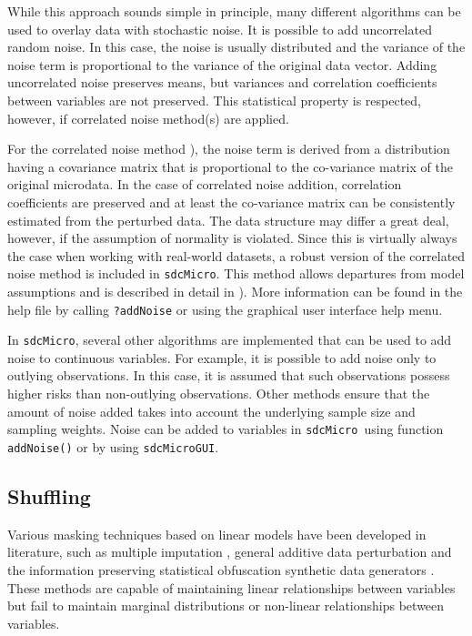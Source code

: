\documentclass[12pt]{scrartcl}\usepackage[]{graphicx}\usepackage[]{color}
\newcommand{\sdcMicro}{\texttt{sdcMicro}}
\newcommand{\sdcMicroGUI}{\texttt{sdcMicroGUI}}
\begin{document}
While this approach sounds simple in principle, many different algorithms can be used to overlay data with stochastic noise. It is possible to add uncorrelated random noise. In this case, the noise is usually distributed and the variance of the noise term is proportional to the variance of the original data vector. Adding uncorrelated noise preserves means, but variances and correlation coefficients between variables are not preserved. This statistical property is respected, however, if correlated noise method(s) are applied.

For the correlated noise method \citep{Brand04}), the noise term is derived from a distribution having a covariance matrix that is proportional to the co-variance matrix of the original microdata. In the case of correlated noise addition, correlation coefficients are preserved and at least the co-variance matrix can be consistently estimated from the perturbed data. The data structure may differ a great deal, however, if the assumption of normality is violated. Since this is virtually always the case when working with real-world datasets, a robust version of the correlated noise method is included in \sdcMicro . This method allows departures from model assumptions and is described in detail in \cite{Templ08f}). More information can be found in the help file by calling \lstinline{?addNoise} or using the graphical user interface help menu.

In \sdcMicro , several other algorithms are implemented that can be used to add noise to continuous variables. For example, it is possible to add noise only to outlying observations. In this case, it is assumed that such observations possess higher risks than non-outlying observations. Other methods ensure that the amount of noise added takes into account the underlying sample size and sampling weights. Noise can be added to variables in \sdcMicro \ using function \lstinline{addNoise()} or by using \sdcMicroGUI.

\subsection{Shuffling}\label{shuffling}
Various masking techniques based on linear models have been developed in literature, such as multiple imputation \citep{rubin93}, general additive data perturbation \citep{Muh99} and the information preserving statistical obfuscation synthetic data generators \citep{Burridge03}. These methods are capable of maintaining linear relationships between variables but fail to maintain marginal distributions or non-linear relationships between variables.
\end{document}
